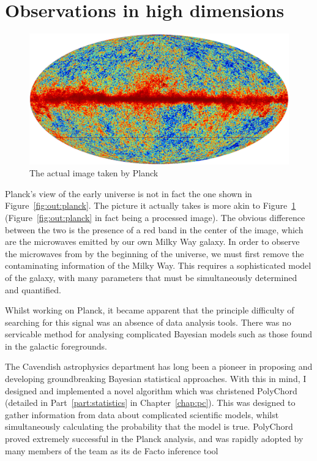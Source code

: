 \section{Observations in high dimensions}
\begin{figure}
  \includegraphics[width=\textwidth]{chapter_outline/figures/planck_galaxy}
  \caption{The actual image taken by Planck}\label{fig:out:planck_galaxy}
\end{figure}
Planck's view of the early universe is not in fact the one shown in Figure~\ref{fig:out:planck}. The picture it actually takes is more akin to Figure~\ref{fig:out:planck_galaxy} (Figure~\ref{fig:out:planck} in fact being a processed image). The obvious difference between the two is the presence of a red band in the center of the image, which are the microwaves emitted by our own Milky Way galaxy. In order to observe the microwaves from by the beginning of the universe, we must first remove the contaminating information of the Milky Way. This requires a sophisticated model of the galaxy, with many parameters that must be simultaneously determined and quantified. 

Whilst working on Planck, it became apparent that the principle difficulty of searching for this signal was an absence of data analysis tools. There was no servicable method for analysing complicated Bayesian models such as those found in the galactic foregrounds.

The Cavendish astrophysics department has long been a pioneer in proposing and developing groundbreaking Bayesian statistical approaches. With this in mind, I designed and implemented a novel algorithm which was christened PolyChord (detailed in Part~\ref{part:statistics} in Chapter~\ref{chap:pc}). This was designed to gather information from data about complicated scientific models, whilst simultaneously calculating the probability that the model is true. PolyChord proved extremely successful in the Planck analysis, and was rapidly adopted by many members of the team as its de Facto inference tool

